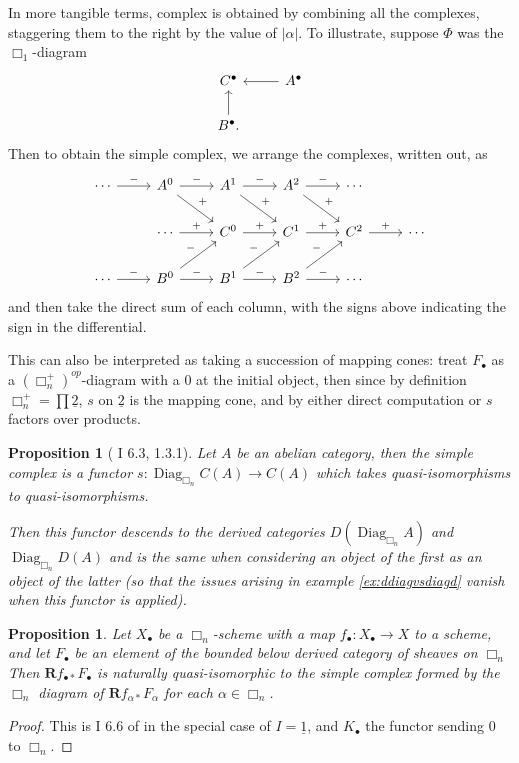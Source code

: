 \documentclass{report}
\newtheorem{prop}[theorem]{Proposition}
\theoremstyle{definition}
\DeclareMathOperator{\Diag}{Diag}
\newcommand{\bR}{\textbf{R}}
\newcommand{\tu}{\underline{2}}
\begin{document}
In more tangible terms, complex is obtained by combining all the complexes, staggering them to the right by the value of $|\alpha|$.
To illustrate, suppose $\Phi$ was the $\Box_1$-diagram
\[
\begin{tikzcd}
C^\bullet & \arrow{l} A^\bullet \\
B^\bullet \arrow{u}.
\end{tikzcd}
\]
Then to obtain the simple complex, we arrange the complexes, written out, as
\[
\begin{tikzcd}
\cdots \arrow{r}{-} &  A^0 \arrow{r}{-} \arrow{dr}{+} & A^1 \arrow{r}{-} \arrow{dr}{+} & A^2 \arrow{r}{-} \arrow{dr}{+} & \cdots \\
& \cdots \arrow{r}{+} & C^0 \arrow{r}{+} & C^1 \arrow{r}{+} & C^2 \arrow{r}{+} & \cdots \\
\cdots \arrow{r}{-} & B^0 \arrow{r}{-} \arrow{ur}{-} & B^1 \arrow{r}{-} \arrow{ur}{-} & B^2 \arrow{r}{-} \arrow{ur}{-} & \cdots
\end{tikzcd}
\]
and then take the direct sum of each column, with the signs above indicating the sign in the differential.

This can also be interpreted as taking a succession of mapping cones: treat $F_\bullet$ as a $(\Box_n^+)^{op}$-diagram with a 0 at the initial object, then since by definition $\Box_n^+ = \prod \tu$, $s$ on $\tu$ is the mapping cone, and by either direct computation or \cite{Guillen2002} $s$ factors over products.

\begin{prop}[\cite{Guillen1988} I 6.3, \cite{Guillen2002} 1.3.1]
	Let $A$ be an abelian category, then the simple complex is a functor $s:\Diag_{\Box_n} C(A) \rightarrow C(A)$ which takes quasi-isomorphisms to quasi-isomorphisms.
	
	Then this functor descends to the derived categories $D(\Diag_{\Box_n} A)$ and $\Diag_{\Box_n} D(A)$ and is the same when considering an object of the first as an object of the latter (so that the issues arising in example \ref{ex:ddiagvsdiagd} vanish when this functor is applied).
\end{prop}
\begin{prop}
	\label{thm:simple}
	Let $X_\bullet$ be a $\Box_n$-scheme with a map $f_\bullet : X_\bullet \rightarrow X$ to a scheme, and let $F_\bullet$ be an element of the bounded below derived category of sheaves on $\Box_n$
	Then $\bR f_{\bullet *} F_\bullet$ is naturally quasi-isomorphic to the simple complex formed by the $\Box_n$ diagram of $\bR f_{\alpha *} F_\alpha$ for each $\alpha \in \Box_n$.
\end{prop}
\begin{proof}
	This is I 6.6 of \cite{Guillen1988} in the special case of $I = \underline{1}$, and $K_\bullet$ the functor sending 0 to $\Box_n$.
\end{proof}
\end{document}

